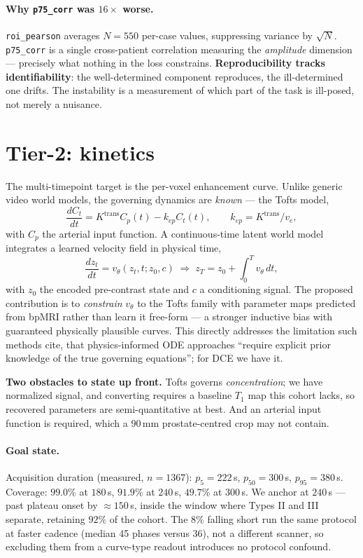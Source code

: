 \documentclass[11pt]{article}
\newcommand{\1}{\mathbb{1}}
\newcommand{\flag}[1]{\textcolor{red!60!black}{\textbf{#1}}}
\begin{document}
\paragraph{Why \texttt{p75\_corr} was $16\times$ worse.} \texttt{roi\_pearson} averages $N=550$
per-case values, suppressing variance by $\sqrt N$. \texttt{p75\_corr} is a single
cross-patient correlation measuring the \emph{amplitude} dimension --- precisely what nothing
in the loss constrains. \textbf{Reproducibility tracks identifiability}: the well-determined
component reproduces, the ill-determined one drifts. The instability is a measurement of
which part of the task is ill-posed, not merely a nuisance.

\section{Tier-2: kinetics}

The multi-timepoint target is the per-voxel enhancement curve. Unlike generic video world
models, the governing dynamics are \emph{known} --- the Tofts model,
\begin{equation}
\frac{dC_t}{dt}=K^{\text{trans}}C_p(t)-k_{ep}C_t(t),\qquad k_{ep}=K^{\text{trans}}/v_e ,
\end{equation}
with $C_p$ the arterial input function. A continuous-time latent world model integrates a
learned velocity field in physical time,
\begin{equation}
\frac{dz_t}{dt}=v_\theta(z_t,t;z_0,c)\;\Longrightarrow\;z_T=z_0+\int_0^T v_\theta\,dt ,
\end{equation}
with $z_0$ the encoded pre-contrast state and $c$ a conditioning signal. The proposed
contribution is to \emph{constrain} $v_\theta$ to the Tofts family with parameter maps
predicted from bpMRI rather than learn it free-form --- a stronger inductive bias with
guaranteed physically plausible curves. This directly addresses the limitation such methods
cite, that physics-informed ODE approaches ``require explicit prior knowledge of the true
governing equations''; for DCE we have it.

\flag{Two obstacles to state up front.} Tofts governs \emph{concentration}; we have
normalized signal, and converting requires a baseline $T_1$ map this cohort lacks, so
recovered parameters are semi-quantitative at best. And an arterial input function is
required, which a $90$\,mm prostate-centred crop may not contain.

\paragraph{Goal state.} Acquisition duration (measured, $n=1367$): $p_5=222$\,s,
$p_{50}=300$\,s, $p_{95}=380$\,s. Coverage: $99.0\%$ at $180$\,s, $\mathbf{91.9\%}$ at
$240$\,s, $49.7\%$ at $300$\,s. We anchor at $240$\,s --- past plateau onset by
$\approx150$\,s, inside the window where Types II and III separate, retaining $92\%$ of the
cohort. The $8\%$ falling short run the same protocol at faster cadence (median 45 phases
versus 36), not a different scanner, so excluding them from a curve-type readout introduces
no protocol confound.
\end{document}
